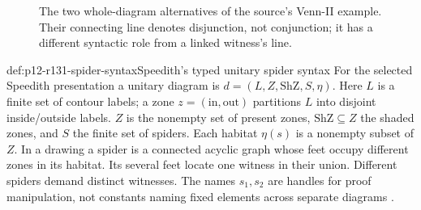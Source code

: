 \begin{figure}[htbp]
\centering
{}
\caption{The two whole-diagram alternatives of the source's Venn-II
example. Their connecting line denotes disjunction, not conjunction;
it has a different syntactic role from a linked witness's line.}
\label{fig:p12-r131-venn-ii}
\end{figure}

\begin{hbdefinition}{def:p12-r131-spider-syntax}{Speedith's typed unitary spider syntax}
For the selected Speedith presentation a unitary diagram is
\(d=(L,Z,\mathrm{ShZ},S,\eta)\). Here \(L\) is a finite set of
contour labels; a zone \(z=(\mathrm{in},\mathrm{out})\) partitions
\(L\) into disjoint inside/outside labels. \(Z\) is the nonempty
set of present zones, \(\mathrm{ShZ}\subseteq Z\) the shaded zones,
and \(S\) the finite set of spiders. Each habitat
\(\eta(s)\) is a nonempty subset of \(Z\). In a drawing a spider
is a connected acyclic graph whose feet occupy different zones in its
habitat. Its several feet locate one witness in their union.
Different spiders demand distinct witnesses. The names \(s_1,s_2\)
are handles for proof manipulation, not constants naming fixed elements
across separate diagrams \cite[pp.~491--493]{UrbasJamnikStapleton2015Speedith}.
\end{hbdefinition}

